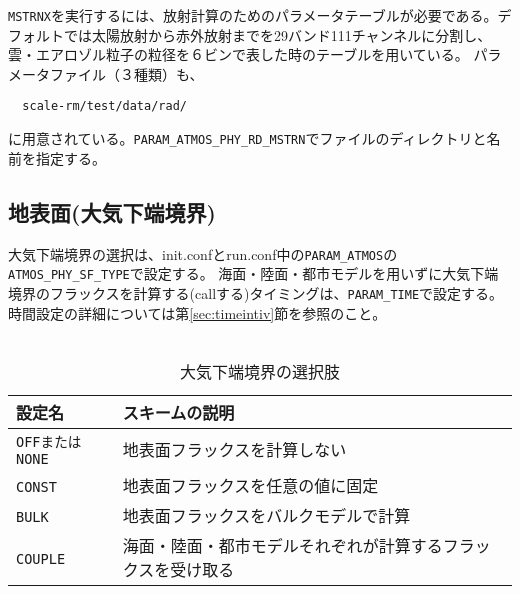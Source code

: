 \verb|MSTRNX|を実行するには、放射計算のためのパラメータテーブルが必要である。デフォルトでは太陽放射から赤外放射までを29バンド111チャンネルに分割し、
雲・エアロゾル粒子の粒径を６ビンで表した時のテーブルを用いている。
パラメータファイル（３種類）も、
\begin{verbatim}
  scale-rm/test/data/rad/
\end{verbatim}
に用意されている。\verb|PARAM_ATMOS_PHY_RD_MSTRN|でファイルのディレクトリと名前を指定する。



\subsection{地表面(大気下端境界)} \label{sec:basic_surface}
大気下端境界の選択は、init.confとrun.conf中の\verb|PARAM_ATMOS|の\verb|ATMOS_PHY_SF_TYPE|で設定する。
海面・陸面・都市モデルを用いずに大気下端境界のフラックスを計算する(callする)タイミングは、\verb|PARAM_TIME|で設定する。
時間設定の詳細については第\ref{sec:timeintiv}節を参照のこと。\\

\\

\begin{table}[h]
\begin{center}
  \caption{大気下端境界の選択肢}
  \label{tab:nml_atm_sf}
  \begin{tabularx}{150mm}{lX} \hline
    \rowcolor[gray]{0.9}  設定名 & スキームの説明\\ \hline
      \verb|OFFまたはNONE| & 地表面フラックスを計算しない \\
      \verb|CONST|   　　　& 地表面フラックスを任意の値に固定 \\
      \verb|BULK|    　　　& 地表面フラックスをバルクモデルで計算 \\
      \verb|COUPLE|  　　　& 海面・陸面・都市モデルそれぞれが計算するフラックスを受け取る \\
    \hline
  \end{tabularx}
\end{center}
\end{table}

